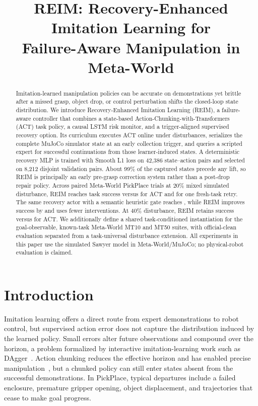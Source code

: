 \documentclass[conference]{IEEEtran}
\title{REIM: Recovery-Enhanced Imitation Learning for\\
Failure-Aware Manipulation in Meta-World}
\author{\IEEEauthorblockN{Anonymous Authors}
\IEEEauthorblockA{Submission under review}}
\begin{document}
\maketitle

\begin{abstract}
Imitation-learned manipulation policies can be accurate on demonstrations yet
brittle after a missed grasp, object drop, or control perturbation shifts the
closed-loop state distribution. We introduce Recovery-Enhanced Imitation
Learning (REIM), a failure-aware controller that combines a state-based
Action-Chunking-with-Transformers (ACT) task policy, a causal LSTM risk monitor,
and a trigger-aligned supervised recovery option. Its curriculum executes ACT
online under disturbances, serializes the complete MuJoCo simulator state at an
early collection trigger, and queries a scripted expert for successful
continuations from those learner-induced states. A deterministic recovery MLP
is trained with Smooth L1 loss on 42,386 state--action pairs and selected on
8,212 disjoint validation pairs. About 99\% of the captured states precede any
lift, so REIM is principally an early pre-grasp correction system rather than a
post-drop repair policy.
Across \PlannedMainEpisodes{} paired Meta-World PickPlace trials at 20\%
mixed simulated disturbance, REIM reaches \FinalREIMSuccess{} task success
versus \FinalACTSuccess{} for ACT and \FinalResetSuccess{} for one fresh-task
retry. The same recovery actor with a semantic heuristic gate reaches
\FinalRLRecoverySuccess{}, while REIM improves success by
\FinalREIMDeltaVsRL{} and uses
\FinalREIMInterventionReductionVsRL{} fewer interventions. At 40\%
disturbance, REIM retains
\FinalREIMSuccessAtFortyNoise{} success versus
\FinalACTSuccessAtFortyNoise{} for ACT.
We additionally define a shared task-conditioned instantiation for the
goal-observable, known-task Meta-World MT10 and MT50 suites, with official-clean
evaluation separated from a task-universal disturbance extension.
All experiments in this paper use the simulated Sawyer model in
Meta-World/MuJoCo; no physical-robot evaluation is claimed.
\end{abstract}

\section{Introduction}
\label{sec:introduction}

Imitation learning offers a direct route from expert demonstrations to robot
control, but supervised action error does not capture the distribution induced
by the learned policy. Small errors alter future observations and compound over
the horizon, a problem formalized by interactive imitation-learning work such
as DAgger~\cite{ross2011dagger}. Action chunking reduces the effective horizon
and has enabled precise manipulation~\cite{zhao2023act}, but a chunked policy
can still enter states absent from the successful demonstrations. In PickPlace,
typical departures include a failed enclosure, premature gripper opening,
object displacement, and trajectories that cease to make goal progress.
\end{document}
